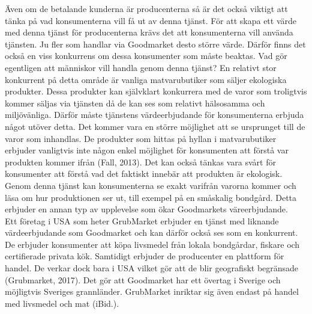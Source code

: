 \documentclass[10pt,a4paper,oneside]{article}
\begin{document}
Även om de betalande kunderna är producenterna så är det också viktigt att tänka på vad konsumenterna vill få ut av denna tjänst. För att skapa ett värde med denna tjänst för producenterna krävs det att konsumenterna vill använda tjänsten. Ju fler som handlar via Goodmarket desto större värde. Därför finns det också en viss konkurrens om dessa konsumenter som måste beaktas. Vad gör egentligen att människor vill handla genom denna tjänst? En relativt stor konkurrent på detta område är vanliga matvarubutiker som säljer ekologiska produkter. Dessa produkter kan självklart konkurrera med de varor som troligtvis kommer säljas via tjänsten då de kan ses som relativt hälsosamma och miljövänliga. Därför måste tjänstens värdeerbjudande för konsumenterna erbjuda något utöver detta. Det kommer vara en  större möjlighet att se ursprunget till de varor som inhandlas. De produkter som hittas på hyllan i matvarubutiker erbjuder vanligtvis inte någon enkel möjlighet för konsumenten att förstå var produkten kommer ifrån (Fall, 2013). Det kan också tänkas vara svårt för konsumenter att förstå vad det faktiskt innebär att produkten är ekologisk. Genom denna tjänst kan konsumenterna se exakt varifrån varorna kommer och läsa om hur produktionen ser ut, till exempel på en småskalig bondgård. Detta erbjuder en annan typ av upplevelse som ökar Goodmarkets väreerbjudande. \\

Ett företag i USA som heter GrubMarket erbjuder en tjänst med liknande värdeerbjudande som Goodmarket och kan därför också ses som en konkurrent. De erbjuder konsumenter att köpa livsmedel från lokala bondgårdar, fiskare och certifierade privata kök. Samtidigt erbjuder de producenter en plattform för handel. De verkar dock bara i USA vilket gör att de blir geografiskt begränsade (Grubmarket, 2017). Det gör att Goodmarket har ett övertag i Sverige och möjligtvis Sveriges grannländer. GrubMarket inriktar sig även endast på handel med livsmedel och mat (iBid.). \\
\end{document}
